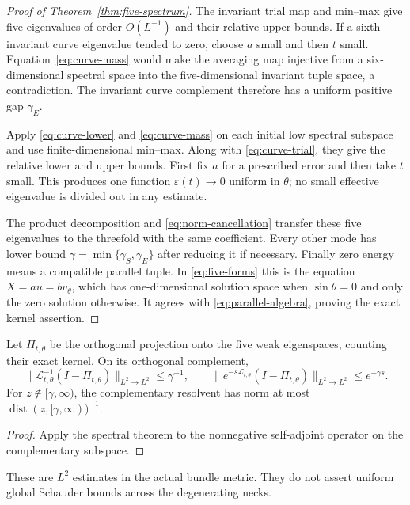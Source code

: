\begin{proof}[Proof of Theorem~\ref{thm:five-spectrum}]
The invariant trial map and min--max give five eigenvalues of order
$O(L^{-1})$ and their relative upper bounds. If a sixth invariant
curve eigenvalue tended to zero, choose $a$ small and then $t$ small.
Equation~\eqref{eq:curve-mass} would make the averaging map injective
from a six-dimensional spectral space into the five-dimensional
invariant tuple space, a contradiction. The invariant curve complement
therefore has a uniform positive gap $\gamma_E$.

Apply \eqref{eq:curve-lower} and \eqref{eq:curve-mass} on each initial
low spectral subspace and use finite-dimensional min--max. Along with
\eqref{eq:curve-trial}, they give the relative lower and upper bounds.
First fix $a$ for a prescribed error and then take $t$ small. This
produces one function $\varepsilon(t)\to0$ uniform in $\theta$;
no small effective eigenvalue is divided out in any estimate.

The product decomposition and \eqref{eq:norm-cancellation} transfer
these five eigenvalues to the threefold with the same coefficient.
Every other mode has lower bound
$\gamma=\min\{\gamma_S,\gamma_E\}$ after reducing it if necessary.
Finally zero energy means a compatible parallel tuple. In
\eqref{eq:five-forms} this is the equation $X=au=bv_\theta$,
which has one-dimensional solution space when $\sin\theta=0$ and
only the zero solution otherwise. It agrees with
\eqref{eq:parallel-algebra}, proving the exact kernel assertion.
\end{proof}

\begin{corollary}\label{cor:complement}
Let $\Pi_{t,\theta}$ be the orthogonal projection onto the five weak
eigenspaces, counting their exact kernel. On its orthogonal complement,
\[
 \|\mathcal L_{t,\theta}^{-1}(I-\Pi_{t,\theta})\|_{L^2\to L^2}
 \le\gamma^{-1},\qquad
 \|e^{-s\mathcal L_{t,\theta}}(I-\Pi_{t,\theta})\|_{L^2\to L^2}
 \le e^{-\gamma s}.
\]
For $z\notin[\gamma,\infty)$, the complementary resolvent has norm
at most $\operatorname{dist}(z,[\gamma,\infty))^{-1}$.
\end{corollary}

\begin{proof}
Apply the spectral theorem to the nonnegative self-adjoint operator
on the complementary subspace.
\end{proof}

These are $L^2$ estimates in the actual bundle metric. They do not
assert uniform global Schauder bounds across the degenerating necks.
